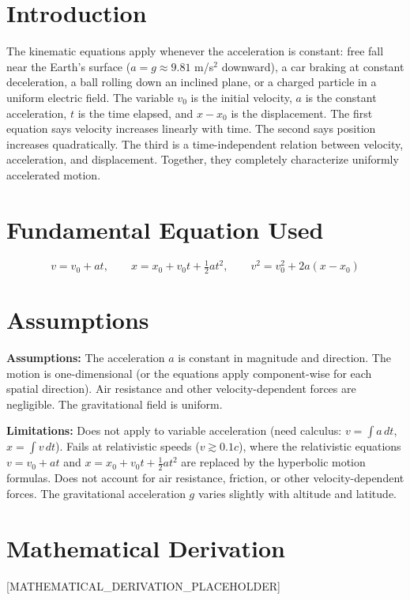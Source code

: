 \documentclass[11pt,openright]{book}
\begin{document}
\section*{Introduction}

The kinematic equations apply whenever the acceleration is constant: free fall near the Earth's surface ($a = g \approx 9.81$ m/s$^2$ downward), a car braking at constant deceleration, a ball rolling down an inclined plane, or a charged particle in a uniform electric field. The variable $v_0$ is the initial velocity, $a$ is the constant acceleration, $t$ is the time elapsed, and $x - x_0$ is the displacement. The first equation says velocity increases linearly with time. The second says position increases quadratically. The third is a time-independent relation between velocity, acceleration, and displacement. Together, they completely characterize uniformly accelerated motion.
\section*{Fundamental Equation Used}

\[
v = v_0 + at,\qquad x = x_0 + v_0 t + \tfrac{1}{2}at^2,\qquad v^2 = v_0^2 + 2a(x - x_0)
\]
\section*{Assumptions}

\textbf{Assumptions:} The acceleration $a$ is constant in magnitude and direction. The motion is one-dimensional (or the equations apply component-wise for each spatial direction). Air resistance and other velocity-dependent forces are negligible. The gravitational field is uniform.


\textbf{Limitations:} Does not apply to variable acceleration (need calculus: $v = \int a\,dt$, $x = \int v\,dt$). Fails at relativistic speeds ($v \gtrsim 0.1c$), where the relativistic equations $v = v_0 + at$ and $x = x_0 + v_0 t + \frac{1}{2}at^2$ are replaced by the hyperbolic motion formulas. Does not account for air resistance, friction, or other velocity-dependent forces. The gravitational acceleration $g$ varies slightly with altitude and latitude.


\section*{Mathematical Derivation}

[MATHEMATICAL_DERIVATION_PLACEHOLDER]
\end{document}
